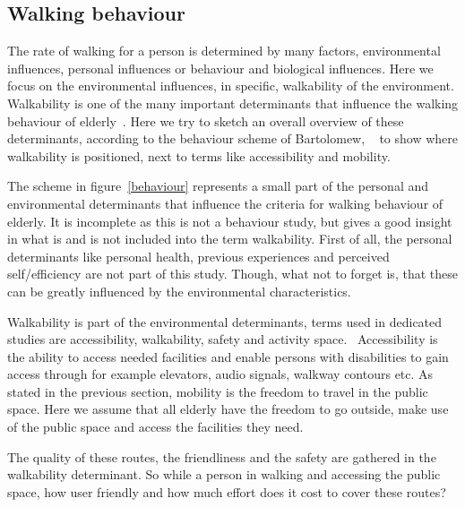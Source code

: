 \subsection{Walking behaviour}\label{walking}
The rate of walking for a person is determined by many factors, environmental influences, personal influences or behaviour and biological influences. Here we focus on the environmental influences, in specific, walkability of the environment. Walkability is one of the many important determinants that influence the walking behaviour of elderly~\cite{Vine2012}. Here we try to sketch an overall overview of these determinants, according to the behaviour scheme of Bartolomew, ~\cite{Bartholmew2011} to show where walkability is positioned, next to terms like accessibility and mobility. 

The scheme in figure~\ref{behaviour} represents a small part of the personal and environmental determinants that influence the criteria for walking behaviour of elderly. It is incomplete as this is not a behaviour study, but gives a good insight in what is and is not included into the term walkability. 
First of all, the personal determinants like personal health, previous experiences and perceived self/efficiency are not part of this study. Though, what not to forget is, that these can be greatly influenced by the environmental characteristics. 

Walkability is part of the environmental determinants, terms used in dedicated studies are accessibility, walkability, safety and activity space.~\cite{Vine2012} Accessibility is the ability to access needed facilities and enable persons with disabilities to gain access through for example elevators, audio signals, walkway contours etc.
As stated in the previous section, mobility is the freedom to travel in the public space. Here we assume that all elderly have the freedom to go outside, make use of the public space and access the facilities they need.

The quality of these routes, the friendliness and the safety are gathered in the walkability determinant. So while a person in walking and accessing the public space, how user friendly and how much effort does it cost to cover these routes?

